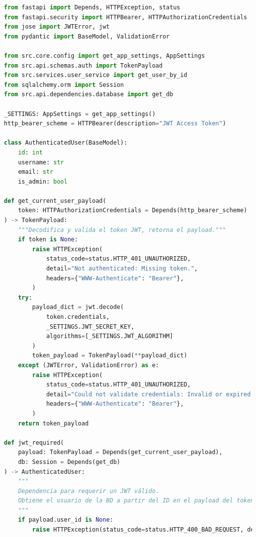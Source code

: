 \clearpage

\begin{lstlisting}[language=python,
                   caption={Dependencias de seguridad \texttt{jwt\_required} y \texttt{admin\_required} (simplificadas - \texttt{src/api/dependencies/auth.py}).},
                   label={lst:desarrollo_jwt-guards}, % Label actualizada
                   basicstyle=\fontsize{8}{9.5}\ttfamily]
from fastapi import Depends, HTTPException, status
from fastapi.security import HTTPBearer, HTTPAuthorizationCredentials
from jose import JWTError, jwt
from pydantic import BaseModel, ValidationError

from src.core.config import get_app_settings, AppSettings
from src.api.schemas.auth import TokenPayload
from src.services.user_service import get_user_by_id
from sqlalchemy.orm import Session
from src.api.dependencies.database import get_db

_SETTINGS: AppSettings = get_app_settings()
http_bearer_scheme = HTTPBearer(description="JWT Access Token")

class AuthenticatedUser(BaseModel):
    id: int
    username: str
    email: str
    is_admin: bool

def get_current_user_payload(
    token: HTTPAuthorizationCredentials = Depends(http_bearer_scheme)
) -> TokenPayload:
    """Decodifica y valida el token JWT, retorna el payload."""
    if token is None:
        raise HTTPException(
            status_code=status.HTTP_401_UNAUTHORIZED,
            detail="Not authenticated: Missing token.",
            headers={"WWW-Authenticate": "Bearer"},
        )
    try:
        payload_dict = jwt.decode(
            token.credentials,
            _SETTINGS.JWT_SECRET_KEY,
            algorithms=[_SETTINGS.JWT_ALGORITHM]
        )
        token_payload = TokenPayload(**payload_dict)
    except (JWTError, ValidationError) as e:
        raise HTTPException(
            status_code=status.HTTP_401_UNAUTHORIZED,
            detail="Could not validate credentials: Invalid or expired token.",
            headers={"WWW-Authenticate": "Bearer"},
        )
    return token_payload

def jwt_required(
    payload: TokenPayload = Depends(get_current_user_payload),
    db: Session = Depends(get_db)
) -> AuthenticatedUser:
    """
    Dependencia para requerir un JWT válido.
    Obtiene el usuario de la BD a partir del ID en el payload del token.
    """
    if payload.user_id is None:
        raise HTTPException(status_code=status.HTTP_400_BAD_REQUEST, detail="Invalid token payload: user_id missing.")


\end{lstlisting}
